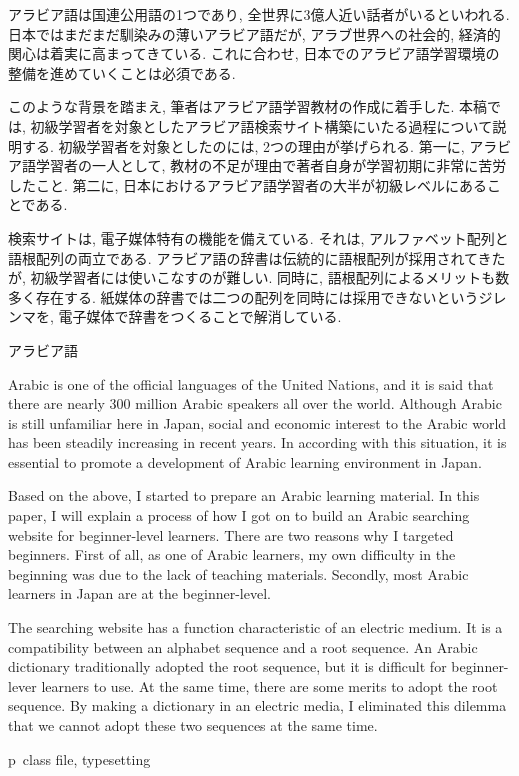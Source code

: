 \documentclass[technicalreport]{ieicej}
\begin{document}
\begin{jabstract}
アラビア語は国連公用語の1つであり, 全世界に3億人近い話者がいるといわれる. 日本ではまだまだ馴染みの薄いアラビア語だが, アラブ世界への社会的, 経済的関心は着実に高まってきている. これに合わせ, 日本でのアラビア語学習環境の整備を進めていくことは必須である. 

このような背景を踏まえ, 筆者はアラビア語学習教材の作成に着手した. 本稿では, 初級学習者を対象としたアラビア語検索サイト構築にいたる過程について説明する. 初級学習者を対象としたのには, 2つの理由が挙げられる. 第一に, アラビア語学習者の一人として, 教材の不足が理由で著者自身が学習初期に非常に苦労したこと. 第二に, 日本におけるアラビア語学習者の大半が初級レベルにあることである. 

検索サイトは, 電子媒体特有の機能を備えている. それは, アルファベット配列と語根配列の両立である. アラビア語の辞書は伝統的に語根配列が採用されてきたが, 初級学習者には使いこなすのが難しい. 同時に, 語根配列によるメリットも数多く存在する. 紙媒体の辞書では二つの配列を同時には採用できないというジレンマを, 電子媒体で辞書をつくることで解消している.
\end{jabstract}
\begin{jkeyword}
アラビア語
\end{jkeyword}
\begin{eabstract}
Arabic is one of the official languages of the United Nations, and it is said that there are nearly 300 million Arabic speakers all over the world.  Although Arabic is still unfamiliar here in Japan, social and economic interest to the Arabic world has been steadily increasing in recent years.  In according with this situation, it is essential to promote a development of Arabic learning environment in Japan.

Based on the above, I started to prepare an Arabic learning material.  In this paper, I will explain a process of how I got on to build an Arabic searching website for beginner-level learners.  There are two reasons why I targeted beginners.  First of all, as one of Arabic learners, my own difficulty in the beginning was due to the lack of teaching materials.  Secondly, most Arabic learners in Japan are at the beginner-level.

The searching website has a function characteristic of an electric medium.  It is a compatibility between an alphabet sequence and a root sequence.  An Arabic dictionary traditionally adopted the root sequence, but it is difficult for beginner-lever learners to use.  At the same time, there are some merits to adopt the root sequence.  By making a dictionary in an electric media, I eliminated this dilemma that we cannot adopt these two sequences at the same time.

\end{eabstract}
\begin{ekeyword}
p\LaTeXe\ class file, typesetting
\end{ekeyword}
\maketitle
\end{document}
